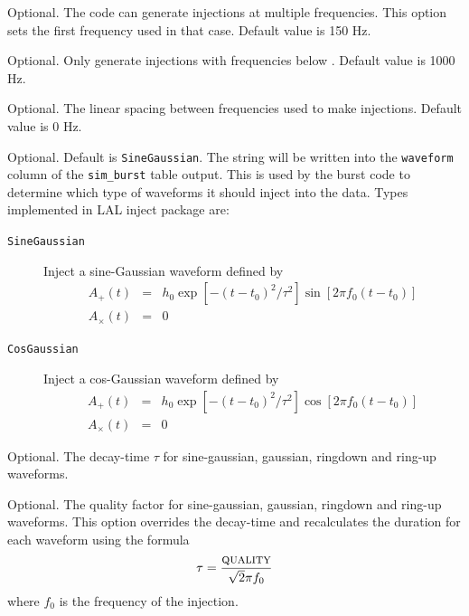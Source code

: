 \begin{entry}
\begin{entry}
\item[\option{--flow} \parm{flow}]
Optional.  The code can generate injections at multiple frequencies.  This
option sets the first frequency used in that case.  Default value is 150
Hz.

\item[\option{--fhigh} \parm{fhigh}]
Optional.  Only generate injections with frequencies below .
Default value is 1000 Hz.

\item[\option{--deltaf} \parm{deltaf}]
Optional.  The linear spacing between frequencies used to make
injections.  Default value is 0 Hz.

\item[\option{--waveform} \parm{wave}]
Optional.  Default is \texttt{SineGaussian}.   The string  will
be written into the \texttt{waveform} column of the \texttt{sim\_burst}
table output. This is used by the burst code to determine which type of
waveforms it should inject into the data.  Types implemented in LAL inject
package are:
\begin{description}
\item[\texttt{SineGaussian}]  Inject a sine-Gaussian waveform defined by
\begin{eqnarray}
A_+(t) &=& h_0 \exp[ - (t-t_0)^2/ \tau^2 ] \sin[ 2 \pi f_0 (t-t_0)] \\
A_\times(t) &=& 0
\end{eqnarray}

\item[\texttt{CosGaussian}]  Inject a cos-Gaussian waveform defined by
\begin{eqnarray}
A_+(t) &=& h_0 \exp[ - (t-t_0)^2/ \tau^2 ] \cos[ 2 \pi f_0 (t-t_0)] \\
A_\times(t) &=& 0
\end{eqnarray}
\end{description}

\item[\option{--tau} \parm{tau}]
Optional.  The decay-time $\tau$ for sine-gaussian,  gaussian,  ringdown
and ring-up waveforms.

\item[\option{--quality} \parm{quality}]
Optional.  The quality factor for sine-gaussian,  gaussian,  ringdown and
ring-up waveforms.    This option overrides the decay-time  and
recalculates the duration for each waveform using the formula
$$ 
\tau = \frac{\textsc{quality} }{ \sqrt{2} \pi f_0 }
$$
where $f_0$ is the frequency of the injection.


\end{entry}
\end{entry}
